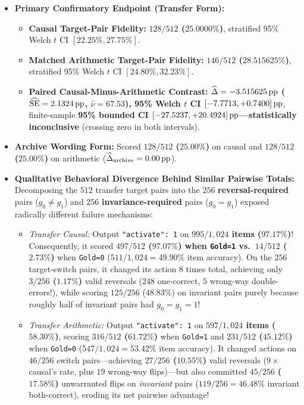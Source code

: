 

\begin{itemize}
  \item \textbf{Primary Confirmatory Endpoint (Transfer Form):}
    \begin{itemize}
      \item \textbf{Causal Target-Pair Fidelity:} \textbf{$128/512$ ($25.0000\%$)}, stratified 95\% Welch $t$ CI $[22.25\%, 27.75\%]$.
      \item \textbf{Matched Arithmetic Target-Pair Fidelity:} \textbf{$146/512$ ($28.515625\%$)}, stratified 95\% Welch $t$ CI $[24.80\%, 32.23\%]$.
      \item \textbf{Paired Causal-Minus-Arithmetic Contrast:} \textbf{$\widehat{\Delta} = -3.515625\,\mathrm{pp}$\textbf{ ($\widehat{\mathrm{SE}} = 2.1324\,\mathrm{pp}$, $\hat{\nu} = 67.53$), }95\% Welch $t$ CI $[-7.7713, +0.7400]\,\mathrm{pp}$}, finite-sample \textbf{95\% bounded CI $[-27.5237, +20.4924]\,\mathrm{pp}$\textbf{---statistically }inconclusive} (crossing zero in both intervals).
    \end{itemize}
  \item \textbf{Archive Wording Form:} Scored \textbf{$128/512$ ($25.00\%$)} on causal and \textbf{$128/512$ ($25.00\%$)} on arithmetic ($\widehat{\Delta}_{\mathrm{archive}} = 0.00\,\mathrm{pp}$).
  \item \textbf{Qualitative Behavioral Divergence Behind Similar Pairwise Totals:} Decomposing the $512$ transfer target pairs into the $256$ \textbf{reversal-required} pairs ($g_0 \neq g_1$) and $256$ \textbf{invariance-required} pairs ($g_0 = g_1$) exposed radically different failure mechanisms:
    \begin{itemize}
      \item \emph{Transfer Causal:} Output \texttt{"activate": 1} on \textbf{$995/1{,}024$ items ($97.17\%$)}! Consequently, it scored \textbf{$497/512$ ($97.07\%$)\textbf{ when \texttt{Gold=1} vs.\ }$14/512$ ($2.73\%$)} when \texttt{Gold=0} ($511/1{,}024 = 49.90\%$ item accuracy). On the $256$ target-switch pairs, it changed its action $8$ times total, achieving only \textbf{$3/256$ ($1.17\%$)} valid reversals ($248$ one-correct, $5$ wrong-way double-errors!), while scoring $125/256$ ($48.83\%$) on invariant pairs purely because roughly half of invariant pairs had $g_0=g_1=1$!
      \item \emph{Transfer Arithmetic:} Output \texttt{"activate": 1} on \textbf{$597/1{,}024$ items ($58.30\%$)}, scoring \textbf{$316/512$ ($61.72\%$)} when \texttt{Gold=1} and \textbf{$231/512$ ($45.12\%$)} when \texttt{Gold=0} ($547/1{,}024 = 53.42\%$ item accuracy). It changed actions on $46/256$ switch pairs---achieving \textbf{$27/256$ ($10.55\%$)} valid reversals ($9\times$ causal's rate, plus $19$ wrong-way flips)---but also committed \textbf{$45/256$ ($17.58\%$)} unwarranted flips on \emph{invariant} pairs ($119/256 = 46.48\%$ invariant both-correct), eroding its net pairwise advantage!

\end{itemize}
\end{itemize}
